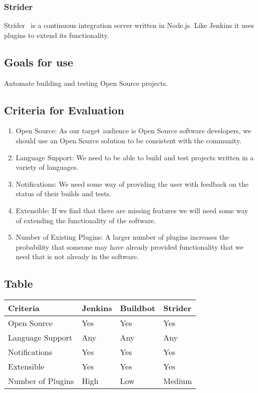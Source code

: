 \documentclass[10pt,letterpaper,onecolumn,journal]{IEEEtran}
\begin{document}
\subsubsection{Strider}
Strider~\cite{stridermain} is a continuous integration server written in Node.js.
Like Jenkins it uses plugins to extend its functionality.
\subsection{Goals for use}
Automate building and testing Open Source projects.
\subsection{Criteria for Evaluation}
\begin{enumerate}
  \item Open Source: As our target audience is Open Source software developers, we should use an Open Source solution to be consistent with the community.
  \item Language Support: We need to be able to build and test projects written in a variety of languages.
  \item Notifications: We need some way of providing the user with feedback on the status of their builds and tests.
  \item Extensible: If we find that there are missing features we will need some way of extending the functionality of the software.
  \item Number of Existing Plugins: A larger number of plugins increases the probability that someone may have already provided functionality that we need that is not already in the software.
\end{enumerate}
\subsection{Table}
\begin{center}
  \begin{tabular}{llll}
    Criteria & Jenkins & Buildbot & Strider \\ \midrule
    Open Source       & Yes & Yes & Yes \\ \midrule
    Language Support  & Any & Any & Any \\ \midrule
    Notifications     & Yes & Yes & Yes \\ \midrule
    Extensible        & Yes & Yes & Yes \\ \midrule
    Number of Plugins & High & Low & Medium \\ \bottomrule
  \end{tabular}
\end{center}
\end{document}
